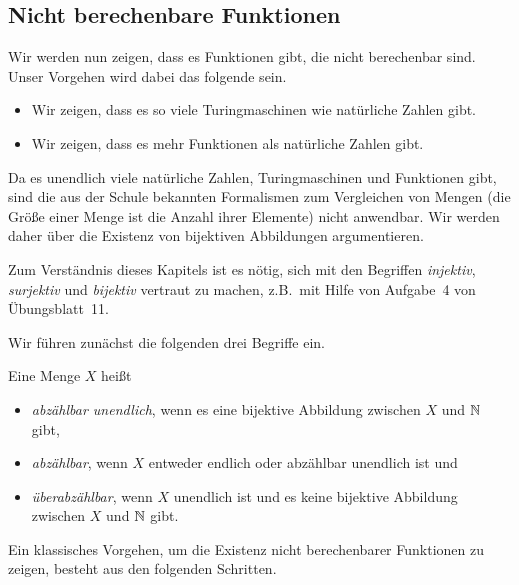 \subsection{Nicht berechenbare Funktionen}

Wir werden nun zeigen, dass es Funktionen gibt, die nicht berechenbar sind.
Unser Vorgehen wird dabei das folgende sein.
\begin{itemize}
 \item Wir zeigen, dass es so viele Turingmaschinen wie natürliche Zahlen gibt.
 \item Wir zeigen, dass es mehr Funktionen als natürliche Zahlen gibt.
\end{itemize}

Da es unendlich viele natürliche Zahlen, Turingmaschinen und Funktionen gibt,
sind die aus der Schule bekannten Formalismen zum Vergleichen von Mengen
(die Größe einer Menge ist die Anzahl ihrer Elemente)
nicht anwendbar.
Wir werden daher über die Existenz von bijektiven Abbildungen argumentieren.

\begin{Bemerkung}
 Zum Verständnis dieses Kapitels ist es nötig, sich mit den Begriffen \emph{injektiv}, \emph{surjektiv} und \emph{bijektiv} vertraut zu machen,
 z.B.\ mit Hilfe von Aufgabe~4 von Übungsblatt~11.
\end{Bemerkung}

Wir führen zunächst die folgenden drei Begriffe ein.
\begin{Def}
Eine Menge $X$ heißt
\begin{itemize}
 \item \emph{abzählbar unendlich}, wenn es eine bijektive Abbildung zwischen $X$ und $\mathbb{N}$ gibt,
 \item \emph{abzählbar}, wenn $X$ entweder endlich oder abzählbar unendlich ist und
 \item \emph{überabzählbar}, wenn $X$ unendlich ist und es keine bijektive Abbildung zwischen $X$ und $\mathbb{N}$ gibt.
 \qedhere
\end{itemize}
\end{Def}

Ein klassisches Vorgehen, um die Existenz nicht berechenbarer Funktionen zu zeigen, besteht aus den folgenden Schritten.

